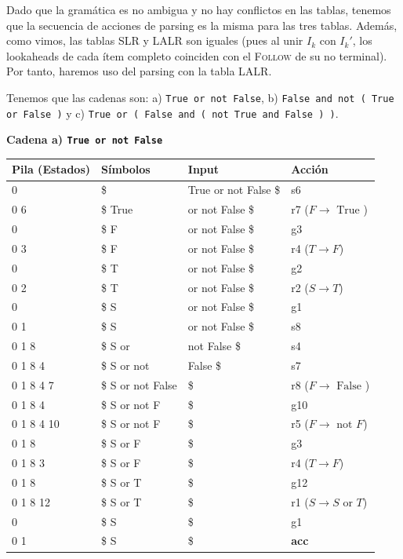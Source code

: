 \documentclass[12pt, letterpaper]{article}
\begin{document}
\begin{enumerate}
Dado que la gramática es no ambigua y no hay conflictos en las tablas, tenemos que la secuencia de acciones de parsing es la misma para las tres tablas. Además, como vimos, las tablas SLR y LALR son iguales (pues al unir $I_k$ con $I_k'$, los lookaheads de cada ítem completo coinciden con el \textsc{Follow} de su no terminal). Por tanto, haremos uso del parsing con la tabla LALR.

Tenemos que las cadenas son: a) \texttt{True or not False}, b) \texttt{False and not ( True or False )} y c) \texttt{True or ( False and ( not True and False ) )}.

\textbf{Cadena a) \texttt{True or not False}}

\begingroup\footnotesize
\begin{longtable}{p{3.6cm}p{4.0cm}p{4.5cm}>{\raggedright\arraybackslash}p{3.6cm}}
\toprule
\textbf{Pila (Estados)} & \textbf{Símbolos} & \textbf{Input} & \textbf{Acción} \\
\midrule
\endhead
0 & \$ & True or not False \$ & s6 \\
0 6 & \$ True & or not False \$ & r7 ($F \to \text{ True }$) \\
0 & \$ F & or not False \$ & g3 \\
0 3 & \$ F & or not False \$ & r4 ($T \to F$) \\
0 & \$ T & or not False \$ & g2 \\
0 2 & \$ T & or not False \$ & r2 ($S \to T$) \\
0 & \$ S & or not False \$ & g1 \\
0 1 & \$ S & or not False \$ & s8 \\
0 1 8 & \$ S or & not False \$ & s4 \\
0 1 8 4 & \$ S or not & False \$ & s7 \\
0 1 8 4 7 & \$ S or not False & \$ & r8 ($F \to \text{ False }$) \\
0 1 8 4 & \$ S or not F & \$ & g10 \\
0 1 8 4 10 & \$ S or not F & \$ & r5 ($F \to \text{ not } F$) \\
0 1 8 & \$ S or F & \$ & g3 \\
0 1 8 3 & \$ S or F & \$ & r4 ($T \to F$) \\
0 1 8 & \$ S or T & \$ & g12 \\
0 1 8 12 & \$ S or T & \$ & r1 ($S \to S \text{ or } T$) \\
0 & \$ S & \$ & g1 \\
0 1 & \$ S & \$ & \textbf{acc} \\
\bottomrule
\end{longtable}
\endgroup


\end{enumerate}
\end{document}
